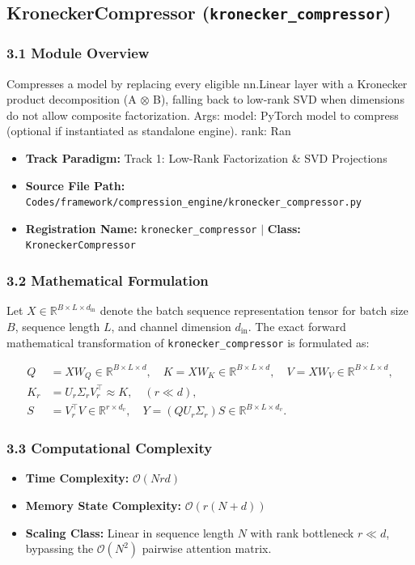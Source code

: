 \subsection{KroneckerCompressor (\texttt{kronecker\_compressor})}
\label{sec:app_module_kronecker_compressor}

\subsubsection*{3.1 Module Overview}
Compresses a model by replacing every eligible nn.Linear layer with a Kronecker product decomposition (A $\otimes$ B), falling back to low-rank SVD when dimensions do not allow composite factorization.  Args:     model: PyTorch model to compress (optional if instantiated as standalone engine).     rank: Ran
\begin{itemize}
    \item \textbf{Track Paradigm:} Track 1: Low-Rank Factorization & SVD Projections
    \item \textbf{Source File Path:} \texttt{Codes/framework/compression\_engine/kronecker\_compressor.py}
    \item \textbf{Registration Name:} \texttt{kronecker\_compressor} $\mid$ \textbf{Class:} \texttt{KroneckerCompressor}
\end{itemize}

\subsubsection*{3.2 Mathematical Formulation}
Let $X \in \mathbb{R}^{B \times L \times d_{\text{in}}}$ denote the batch sequence representation tensor for batch size $B$, sequence length $L$, and channel dimension $d_{\text{in}}$. The exact forward mathematical transformation of \texttt{kronecker\_compressor} is formulated as:

\begin{align}
Q &= X W_Q \in \mathbb{R}^{B \times L \times d}, \quad K = X W_K \in \mathbb{R}^{B \times L \times d}, \quad V = X W_V \in \mathbb{R}^{B \times L \times d}, \\
K_r &= U_r \Sigma_r V_r^\top \approx K, \quad (r \ll d), \\
S &= V_r^\top V \in \mathbb{R}^{r \times d_v}, \quad Y = (Q U_r \Sigma_r) S \in \mathbb{R}^{B \times L \times d_v}.
\end{align}


\subsubsection*{3.3 Computational Complexity}
\begin{itemize}
    \item \textbf{Time Complexity:} $\mathcal{O}(N r d)$
    \item \textbf{Memory State Complexity:} $\mathcal{O}(r(N + d))$
    \item \textbf{Scaling Class:} Linear in sequence length $N$ with rank bottleneck $r \ll d$, bypassing the $\mathcal{O}(N^2)$ pairwise attention matrix.
\end{itemize}

